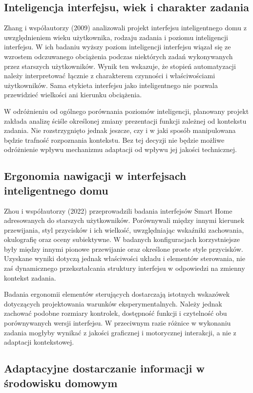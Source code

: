\documentclass[11pt,a4paper]{article}
\begin{document}
\subsection{Inteligencja interfejsu, wiek i charakter zadania}

Zhang i współautorzy (2009) analizowali projekt interfejsu inteligentnego domu z uwzględnieniem wieku użytkownika, rodzaju zadania i poziomu inteligencji interfejsu. W ich badaniu wyższy poziom inteligencji interfejsu wiązał się ze wzrostem odczuwanego obciążenia podczas niektórych zadań wykonywanych przez starszych użytkowników. Wynik ten wskazuje, że stopień automatyzacji należy interpretować łącznie z charakterem czynności i właściwościami użytkowników. Sama etykieta interfejsu jako inteligentnego nie pozwala przewidzieć wielkości ani kierunku obciążenia.

W odróżnieniu od ogólnego porównania poziomów inteligencji, planowany projekt zakłada analizę ściśle określonej zmiany prezentacji funkcji zależnej od kontekstu zadania. Nie rozstrzygnięto jednak jeszcze, czy i w jaki sposób manipulowana będzie trafność rozpoznania kontekstu. Bez tej decyzji nie będzie możliwe odróżnienie wpływu mechanizmu adaptacji od wpływu jej jakości technicznej.

\subsection{Ergonomia nawigacji w interfejsach inteligentnego domu}

Zhou i współautorzy (2022) przeprowadzili badania interfejsów Smart Home adresowanych do starszych użytkowników. Porównywali między innymi kierunek przewijania, styl przycisków i ich wielkość, uwzględniając wskaźniki zachowania, okulografię oraz oceny subiektywne. W badanych konfiguracjach korzystniejsze były między innymi pionowe przewijanie oraz określone proste style przycisków. Uzyskane wyniki dotyczą jednak właściwości układu i elementów sterowania, nie zaś dynamicznego przekształcania struktury interfejsu w odpowiedzi na zmienny kontekst zadania.

Badania ergonomii elementów sterujących dostarczają istotnych wskazówek dotyczących projektowania warunków eksperymentalnych. Należy jednak zachować podobne rozmiary kontrolek, dostępność funkcji i czytelność obu porównywanych wersji interfejsu. W przeciwnym razie różnice w wykonaniu zadania mogłyby wynikać z jakości graficznej i motorycznej interakcji, a nie z adaptacji kontekstowej.

\subsection{Adaptacyjne dostarczanie informacji w środowisku domowym}
\end{document}

